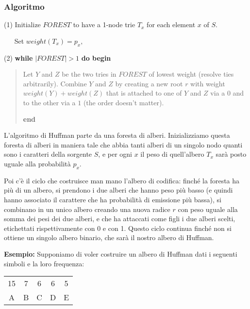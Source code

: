 \begin{mdframed}[backgroundcolor=gray!20,shadow=false]
\subsubsection{Algoritmo}
(1) Initialize \(FOREST\) to have a 1-node trie \(T_x\) for each element \(x\) of \(S\).

\(\>\>\>\>\>\>\>\)Set \(weight(T_x) = p_x,\)

\vspace{5mm}

(2) \textbf{while} \(|FOREST| > 1\) \textbf{do begin}
\begin{quote}
Let \(Y\) and \(Z\) be the two tries in \(FOREST\) of lowest weight (resolve ties arbitrarily). Combine \(Y\) and \(Z\) by creating a new root \(r\) with weight \(weight(Y) + weight(Z)\) that is attached to one of \(Y\) and \(Z\) via a \(0\) and to the other via a \(1\) (the order doesn't matter).

\textbf{end}

\end{quote}


\end{mdframed}
L'algoritmo di Huffman parte da una foresta di alberi. Inizializziamo questa foresta di alberi in maniera tale che abbia tanti alberi di un singolo nodo quanti sono i caratteri della sorgente \(S\), e per ogni \(x\) il peso di quell'albero \(T_x\) sarà posto uguale alla probabilità \(p_x\). 

Poi c'è il ciclo che costruisce man mano l'albero di codifica: finché la foresta ha più di un albero, si prendono i due alberi che hanno peso più basso (e quindi hanno associato il carattere che ha probabilità di emissione più bassa), si combinano in un unico albero creando una nuova radice \(r\) con peso uguale alla somma dei pesi dei due alberi, e che ha attaccati come figli i due alberi scelti, etichettati rispettivamente con 0 e con 1. Questo ciclo continua finché non si ottiene un singolo albero binario, che sarà il nostro albero di Huffman. 

\vspace{5mm}

\textbf{Esempio:} Supponiamo di voler costruire un albero di Huffman dati i seguenti simboli e la loro frequenza:

\begin{table}[htbp]
\centering
\begin{tabular}{ccccc}
15 & 7 & 6 & 6 & 5  \\
A  & B & C & D & E 
\end{tabular}
\end{table}

